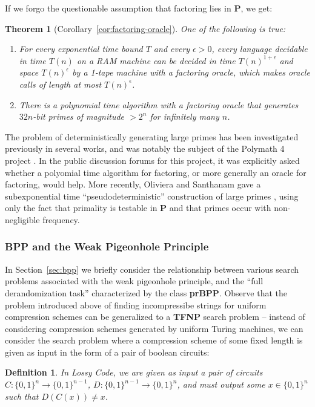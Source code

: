 \documentclass[11pt]{article}
\newtheorem*{theorem*}{Theorem}
\newtheorem{definition}{Definition}
\newcommand{\B}{\{0,1\}}
\def\cl{\bf}
\begin{document}
If we forgo the questionable assumption that factoring lies in {\cl P}, we get:
\begin{theorem*}[Corollary~\ref{cor:factoring-oracle}]
One of the following is true:
\begin{enumerate}
    \item For every exponential time bound $T$ and every $\epsilon>0$, every language decidable in time $T(n)$ on a RAM machine can be decided in time $T(n)^{1+\epsilon}$ and space $T(n)^{\epsilon}$ by a 1-tape machine with a factoring oracle, which makes oracle calls of length at most $T(n)^{\epsilon}$.
    \item There is a polynomial time algorithm with a factoring oracle that generates $32n$-bit primes of magnitude $>2^n$ for infinitely many $n$.
\end{enumerate}
\end{theorem*}

The problem of deterministically generating large primes has been investigated previously in several works, and was notably the subject of the Polymath 4 project \cite{polymath}. In the public discussion forums for this project, it was explicitly asked whether a polyomial time algorithm for factoring, or more generally an oracle for factoring, would help. More recently, Oliviera and Santhanam gave a subexponential time ``pseudodeterministic'' construction of large primes \cite{pseudo-primes}, using only the fact that primality is testable in {\cl P} \cite{primes} and that primes occur with non-negligible frequency.

\subsubsection{BPP and the Weak Pigeonhole Principle}
In Section~\ref{sec:bpp} we briefly consider the relationship between various search problems associated with the weak pigeonhole principle, and the ``full derandomization task'' characterized by the class {\cl prBPP}. Observe that the problem introduced above of finding incompressibe strings for uniform compression schemes can be generalized to a {\cl TFNP} search problem -- instead of considering compression schemes generated by uniform Turing machines, we can consider the search problem where a compression scheme of some fixed length is given as input in the form of a pair of boolean circuits:
\begin{definition}
In {\sc Lossy Code}, we are given as input a pair of circuits $C\colon \B^n \to \B^{n-1}$, $D\colon\B^{n-1}\to\B^n$, and must output some $x \in \B^n$ such that $D(C(x))\neq x$.
\end{definition}
\end{document}
